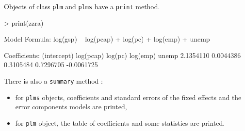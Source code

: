 \documentclass{article}
\begin{document}
Objects of class \texttt{plm} and \texttt{plms} have a \texttt{print}
method. 

\begin{Schunk}
\begin{Sinput}
> print(zzra)
\end{Sinput}
\begin{Soutput}
Model Formula: log(gsp) ~ log(pcap) + log(pc) + log(emp) + unemp

Coefficients:
(intercept)   log(pcap)     log(pc)    log(emp)       unemp 
  2.1354110   0.0044386   0.3105484   0.7296705  -0.0061725 
\end{Soutput}
\end{Schunk}

There is also a \texttt{summary} method :

\begin{itemize}
\item for  \texttt{plms} objects, coefficients and standard errors
  of the fixed effects and the error components models are printed,
\item for  \texttt{plm} object, the table of coefficients and some
  statistics are printed.
\end{itemize}
\end{document}
